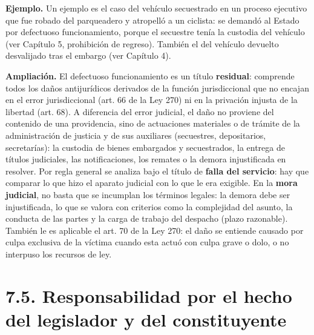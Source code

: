 \begin{ejemplo}
\textcolor[HTML]{4F6228}{\textbf{Ejemplo. }}Un ejemplo es el caso del vehículo secuestrado en un proceso ejecutivo que fue robado del parqueadero y atropelló a un ciclista: se demandó al Estado por defectuoso funcionamiento, porque el secuestre tenía la custodia del vehículo (ver Capítulo 5, prohibición de regreso). También el del vehículo devuelto desvalijado tras el embargo (ver Capítulo 4).
\end{ejemplo}
\begin{ampliacion}
\textcolor[HTML]{5B3F8C}{\textbf{Ampliación. }}El defectuoso funcionamiento es un título \textbf{residual}: comprende todos los daños antijurídicos derivados de la función jurisdiccional que no encajan en el error jurisdiccional (art. 66 de la Ley 270) ni en la privación injusta de la libertad (art. 68). A diferencia del error judicial, el daño no proviene del contenido de una providencia, sino de actuaciones materiales o de trámite de la administración de justicia y de sus auxiliares (secuestres, depositarios, secretarías): la custodia de bienes embargados y secuestrados, la entrega de títulos judiciales, las notificaciones, los remates o la demora injustificada en resolver. Por regla general se analiza bajo el título de \textbf{falla del servicio}: hay que comparar lo que hizo el aparato judicial con lo que le era exigible. En la \textbf{mora judicial}, no basta que se incumplan los términos legales: la demora debe ser injustificada, lo que se valora con criterios como la complejidad del asunto, la conducta de las partes y la carga de trabajo del despacho (plazo razonable). También le es aplicable el art. 70 de la Ley 270: el daño se entiende causado por culpa exclusiva de la víctima cuando esta actuó con culpa grave o dolo, o no interpuso los recursos de ley.
\end{ampliacion}
\section{7.5. Responsabilidad por el hecho del legislador y del constituyente}

